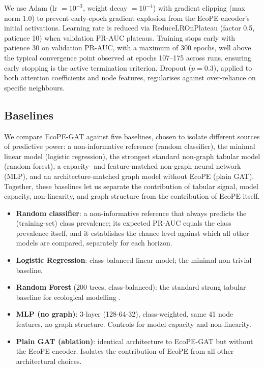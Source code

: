 \documentclass[a4paper,fleqn]{cas-sc}
\begin{document}
We use Adam \citep{kingma2015} (lr $= 10^{-3}$, weight decay $= 10^{-4}$) with gradient clipping (max norm 1.0) to prevent early-epoch gradient explosion from the EcoPE encoder's initial activations. Learning rate is reduced via ReduceLROnPlateau (factor 0.5, patience 10) when validation PR-AUC plateaus. Training stops early with patience 30 on validation PR-AUC, with a maximum of 300 epochs, well above the typical convergence point observed at epochs 107--175 across runs, ensuring early stopping is the active termination criterion. Dropout ($p=0.3$), applied to both attention coefficients and node features, regularises against over-reliance on specific neighbours.

\subsection{Baselines}

We compare EcoPE-GAT against five baselines, chosen to isolate different sources of predictive power: a non-informative reference (random classifier), the minimal linear model (logistic regression), the strongest standard non-graph tabular model (random forest), a capacity- and feature-matched non-graph neural network (MLP), and an architecture-matched graph model without EcoPE (plain GAT). Together, these baselines let us separate the contribution of tabular signal, model capacity, non-linearity, and graph structure from the contribution of EcoPE itself.

\begin{itemize}[leftmargin=1.4em]
  \item \textbf{Random classifier}: a non-informative reference that always predicts the (training-set) class prevalence; its expected PR-AUC equals the class prevalence itself, and it establishes the chance level against which all other models are compared, separately for each horizon.
  \item \textbf{Logistic Regression}: class-balanced linear model; the minimal non-trivial baseline.
  \item \textbf{Random Forest} (200 trees, class-balanced): the standard strong tabular baseline for ecological modelling \citep{valavi2022}.
  \item \textbf{MLP (no graph)}: 3-layer (128-64-32), class-weighted, same 41 node features, no graph structure. Controls for model capacity and non-linearity.
  \item \textbf{Plain GAT (ablation)}: identical architecture to EcoPE-GAT but without the EcoPE encoder. Isolates the contribution of EcoPE from all other architectural choices.
\end{itemize}
\end{document}
